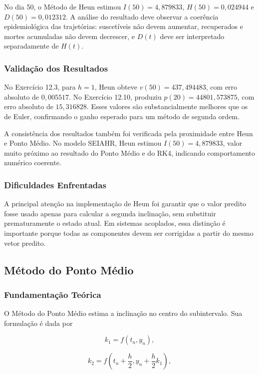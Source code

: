 No dia 50, o Método de Heun estimou \(I(50)=4{,}879833\), \(H(50)=0{,}024944\) e \(D(50)=0{,}012312\). A análise do resultado deve observar a coerência epidemiológica das trajetórias: suscetíveis não devem aumentar, recuperados e mortes acumuladas não devem decrescer, e \(D(t)\) deve ser interpretado separadamente de \(H(t)\).

\subsubsection{Validação dos Resultados}

No Exercício 12.3, para \(h=1\), Heun obteve \(v(50)=437{,}494483\), com erro absoluto de \(0{,}005517\). No Exercício 12.10, produziu \(p(20)=44801{,}573875\), com erro absoluto de \(15{,}316828\). Esses valores são substancialmente melhores que os de Euler, confirmando o ganho esperado para um método de segunda ordem.

A consistência dos resultados também foi verificada pela proximidade entre Heun e Ponto Médio. No modelo SEIAHR, Heun estimou \(I(50)=4{,}879833\), valor muito próximo ao resultado do Ponto Médio e do RK4, indicando comportamento numérico coerente.

\subsubsection{Dificuldades Enfrentadas}

A principal atenção na implementação de Heun foi garantir que o valor predito fosse usado apenas para calcular a segunda inclinação, sem substituir prematuramente o estado atual. Em sistemas acoplados, essa distinção é importante porque todas as componentes devem ser corrigidas a partir do mesmo vetor predito.

\subsection{Método do Ponto Médio}

\subsubsection{Fundamentação Teórica}

O Método do Ponto Médio estima a inclinação no centro do subintervalo. Sua formulação é dada por

\[
    k_1=f(t_n,y_n),
\]

\[
    k_2=f\left(t_n+\frac{h}{2},y_n+\frac{h}{2}k_1\right),
\]

